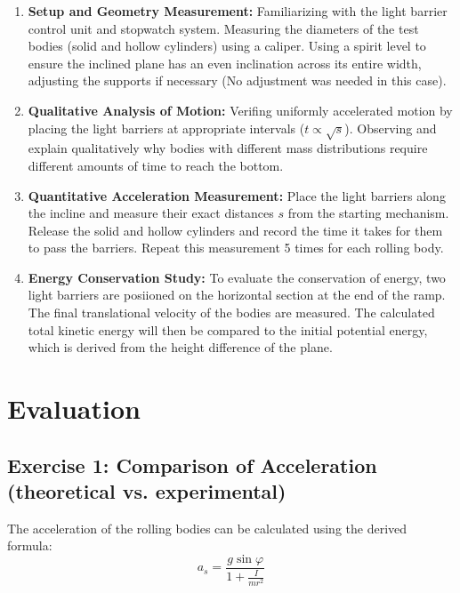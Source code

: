 \documentclass[12pt,a4paper,titlepage]{scrartcl}
\numberwithin{equation}{section}
\numberwithin{table}{section}
\numberwithin{figure}{section}
\begin{document}
\begin{enumerate}
    \item \textbf{Setup and Geometry Measurement:} Familiarizing with the light barrier control unit and stopwatch system. Measuring the diameters of the test bodies (solid and hollow cylinders) using a caliper. Using a spirit level to ensure the inclined plane has an even inclination across its entire width, adjusting the supports if necessary (No adjustment was needed in this case).
    
    \item \textbf{Qualitative Analysis of Motion:} Verifing uniformly accelerated motion by placing the light barriers at appropriate intervals ($t \propto \sqrt{s}$). Observing and explain qualitatively why bodies with different mass distributions require different amounts of time to reach the bottom.
    
    \item \textbf{Quantitative Acceleration Measurement:} Place the light barriers along the incline and measure their exact distances $s$ from the starting mechanism. Release the solid and hollow cylinders and record the time it takes for them to pass the barriers. Repeat this measurement 5 times for each rolling body.
    
    \item \textbf{Energy Conservation Study:} To evaluate the conservation of energy, two light barriers are posiioned on the horizontal section at the end of the ramp. The final translational velocity of the bodies are measured. The calculated total kinetic energy will then be compared to the initial potential energy, which is derived from the height difference of the plane.
\end{enumerate}

\section{Evaluation}

\subsection{Exercise 1: Comparison of Acceleration (theoretical vs. experimental)}

The acceleration of the rolling bodies can be calculated using the derived formula:
\begin{equation}
    a_s = \frac{g \sin\varphi}{1 + \frac{I}{mr^2}}
\end{equation}     
\end{document}
